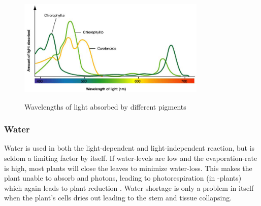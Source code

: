 \begin{figure}
\centering
\includegraphics[width=0.8\textwidth]{img/photosynthesis/absorption-spectrum.png}
\caption{Wavelengths of light absorbed by different pigments}
\citep{uicbiology}
\label{fig:wavelengthabsorbtion}
\end{figure}

\subsubsection{Water}
Water is used in both the light-dependent and light-independent reaction, but is seldom a limiting factor by itself. If water-levels are low and the evaporation-rate is high, most plants will close the leaves to minimize water-loss. This makes the plant unable to absorb  and photons, leading to photorespiration (in -plants) which again leads to plant reduction \citep{bi2}. Water shortage is only a problem in itself when the plant’s cells dries out leading to the stem and tissue collapsing. 
